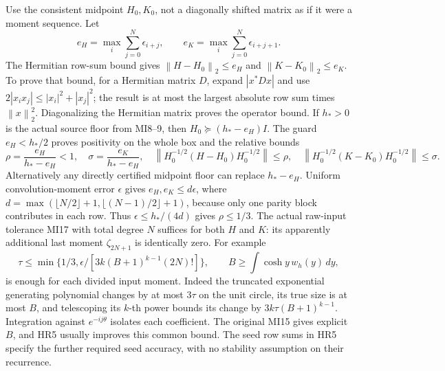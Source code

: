 \documentclass[11pt]{article}
\newcommand{\norm}[1]{\left\lVert#1\right\rVert}
\begin{document}
Use the consistent midpoint \(H_0,K_0\), not a diagonally shifted
matrix as if it were a moment sequence. Let
\begin{equation}\tag{HR10}\label{HR10}
e_H=\max_i\sum_{j=0}^N\epsilon_{i+j},\qquad
e_K=\max_i\sum_{j=0}^N\epsilon_{i+j+1}.
\end{equation}
The Hermitian row-sum bound gives \(\norm{H-H_0}_2\le e_H\) and
\(\norm{K-K_0}_2\le e_K\). To prove that bound, for a Hermitian
matrix \(D\), expand \(|x^*Dx|\) and use
\(2|x_i x_j|\le|x_i|^2+|x_j|^2\); the result is at most the
largest absolute row sum times \(\norm x_2^2\). Diagonalizing the
Hermitian matrix proves the operator bound.
If \(h_*>0\) is the actual source floor from MI8--9, then
\(H_0\succeq(h_*-e_H)I\). The guard \(e_H<h_*/2\) proves positivity
on the whole box and the relative bounds
\begin{equation}\tag{HR11}\label{HR11}
\rho=\frac{e_H}{h_*-e_H}<1,\quad
\sigma=\frac{e_K}{h_*-e_H},\quad
\norm{H_0^{-1/2}(H-H_0)H_0^{-1/2}}\le\rho,\quad
\norm{H_0^{-1/2}(K-K_0)H_0^{-1/2}}\le\sigma.
\end{equation}
Alternatively any directly certified midpoint floor can replace
\(h_*-e_H\). Uniform convolution-moment error \(\epsilon\) gives
\(e_H,e_K\le d\epsilon\), where
\(d=\max(\lfloor N/2\rfloor+1,\lfloor(N-1)/2\rfloor+1)\), because
only one parity block contributes in each row. Thus
\(\epsilon\le h_*/(4d)\) gives \(\rho\le1/3\).
The actual raw-input tolerance MI17 with total degree \(N\) suffices
for both \(H\) and \(K\): its apparently additional last moment
\(\zeta_{2N+1}\) is identically zero. For example
\begin{equation}\tag{HR12}\label{HR12}
\tau\le\min\{1/3,\epsilon/[3k(B+1)^{k-1}(2N)!]\},\qquad
B\ge\int\cosh y\,w_h(y)\,dy,
\end{equation}
is enough for each divided input moment. Indeed the truncated
exponential generating polynomial changes by at most \(3\tau\) on
the unit circle, its true size is at most \(B\), and telescoping
its \(k\)-th power bounds its change by \(3k\tau(B+1)^{k-1}\).
Integration against \(e^{-ij\theta}\) isolates each coefficient.
The original MI15 gives explicit \(B\), and HR5 usually improves this
common bound. The seed row sums in HR5 specify the further required
seed accuracy, with no stability assumption on their recurrence.
\end{document}
